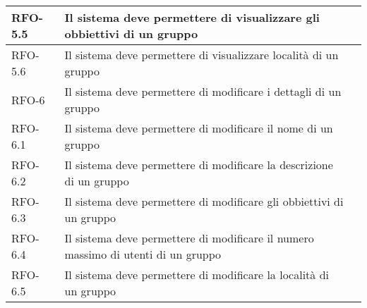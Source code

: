 \begin{center}
{\begin{longtable}{
      |>{\centering\arraybackslash}p{60pt}
      |>{\centering\arraybackslash}p{220pt}
      |>{\centering\arraybackslash}p{60pt}|}
      RFO-5.5                                                              & Il sistema deve permettere di visualizzare gli obbiettivi
      di un gruppo                                                         & \nameref{sub:visualizzazione-obbiettivi-gruppo}               \\
      \hline

      RFO-5.6                                                              & Il sistema deve permettere di visualizzare  località di
      un gruppo                                                            & \nameref{sub:visualizzazione-località-gruppo}                 \\
      \hline

      RFO-6                                                                & Il sistema deve permettere di modificare i dettagli di un
      gruppo                                                               & \nameref{uc:scenario-modifica-gruppo}                         \\
      \hline

      RFO-6.1                                                              & Il sistema deve permettere di modificare il nome di un
      gruppo                                                               & \nameref{sub:modifica-nome-gruppo}                            \\
      \hline

      RFO-6.2                                                              & Il sistema deve permettere di modificare la descrizione
      di un gruppo                                                         & \nameref{sub:modifica-descrizione-gruppo}                     \\
      \hline

      RFO-6.3                                                              & Il sistema deve permettere di modificare gli obbiettivi
      di un gruppo                                                         & \nameref{sub:modifica-obbiettivi-gruppo}                      \\
      \hline

      RFO-6.4                                                              & Il sistema deve permettere di modificare il numero
      massimo di utenti di un gruppo                                       & \nameref{sub:modifica-numero-utenti-gruppo}                   \\
      \hline

      RFO-6.5                                                              & Il sistema deve permettere di modificare la località di
      un gruppo                                                            & \nameref{sub:modifica-località-gruppo}                        \\
      \hline


\end{longtable}}
\end{center}
